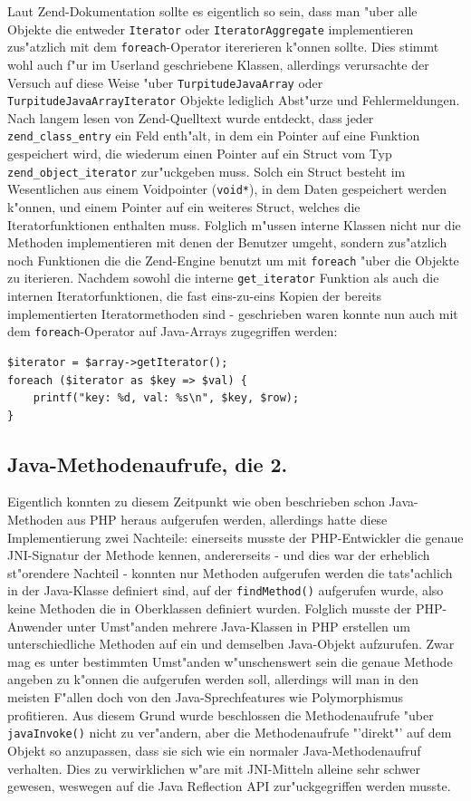 Laut Zend-Dokumentation sollte es eigentlich so sein, dass man "uber alle Objekte die entweder \texttt{Iterator} oder \texttt{IteratorAggregate} implementieren zus"atzlich mit
dem \texttt{foreach}-Operator itererieren k"onnen sollte. Dies stimmt wohl auch f"ur im Userland geschriebene Klassen, allerdings verursachte der Versuch auf diese Weise
"uber \texttt{TurpitudeJavaArray} oder \texttt{TurpitudeJavaArrayIterator} Objekte lediglich Abst"urze und Fehlermeldungen. Nach langem lesen von Zend-Quelltext
wurde entdeckt, dass jeder \texttt{zend\_class\_entry} ein Feld enth"alt, in dem ein Pointer auf eine Funktion gespeichert wird, die wiederum einen Pointer auf ein Struct vom Typ
\texttt{zend\_object\_iterator} zur"uckgeben muss. Solch ein Struct besteht im Wesentlichen aus einem Voidpointer (\texttt{void*}), in dem Daten gespeichert werden k"onnen, und
einem Pointer auf ein weiteres Struct, welches die Iteratorfunktionen enthalten muss. Folglich m"ussen interne Klassen nicht nur die Methoden implementieren mit denen der
Benutzer umgeht, sondern zus"atzlich noch Funktionen die die Zend-Engine benutzt um mit \texttt{foreach} "uber die Objekte zu iterieren. Nachdem sowohl die interne
\texttt{get\_iterator} Funktion als auch die internen Iteratorfunktionen, die fast eins-zu-eins Kopien der bereits implementierten Iteratormethoden sind - geschrieben waren
konnte nun auch mit dem \texttt{foreach}-Operator auf Java-Arrays zugegriffen werden:
\begin{lstlisting}[caption=Java-Array und foreach]
$iterator = $array->getIterator();
foreach ($iterator as $key => $val) {
    printf("key: %d, val: %s\n", $key, $row);
}
\end{lstlisting}

\subsection{Java-Methodenaufrufe, die 2.}
\label{sec:chap1:impl:12}

Eigentlich konnten zu diesem Zeitpunkt wie oben beschrieben schon Java-Methoden aus PHP heraus aufgerufen werden, allerdings hatte
diese Implementierung zwei Nachteile: einerseits musste der PHP-Entwickler die genaue JNI-Signatur der Methode kennen, andererseits -
und dies war der erheblich st"orendere Nachteil - konnten nur Methoden aufgerufen werden die tats"achlich in der Java-Klasse definiert
sind, auf der \texttt{findMethod()} aufgerufen wurde, also keine Methoden die in Oberklassen definiert wurden. Folglich musste der
PHP-Anwender unter Umst"anden mehrere Java-Klassen in PHP erstellen um unterschiedliche Methoden auf ein und demselben Java-Objekt
aufzurufen. Zwar mag es unter bestimmten Umst"anden w"unschenswert sein die genaue Methode angeben zu k"onnen die aufgerufen werden
soll, allerdings will man in den meisten F"allen doch von den Java-Sprechfeatures wie Polymorphismus profitieren. Aus diesem Grund
wurde beschlossen die Methodenaufrufe "uber \texttt{javaInvoke()} nicht zu ver"andern, aber die Methodenaufrufe "'direkt"' auf dem Objekt
so anzupassen, dass sie sich wie ein normaler Java-Methodenaufruf verhalten. Dies zu verwirklichen w"are mit JNI-Mitteln alleine
sehr schwer gewesen, weswegen auf die Java Reflection API zur"uckgegriffen werden musste.

